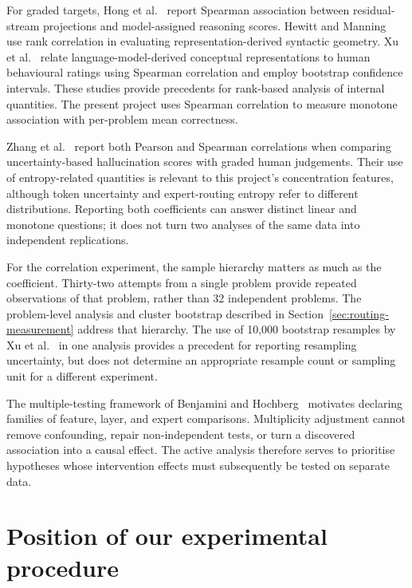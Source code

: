 \documentclass[12pt,a4paper,twoside,openright]{book}
\begin{document}
For graded targets, Hong et al.~\cite{hong2025interplay} report Spearman
association between residual-stream projections and model-assigned reasoning
scores. Hewitt and Manning~\cite{hewitt2019structural} use rank correlation in
evaluating representation-derived syntactic geometry. Xu et
al.~\cite{xu2025conceptual} relate language-model-derived conceptual
representations to human behavioural ratings using Spearman correlation and
employ bootstrap confidence intervals. These studies provide precedents for
rank-based analysis of internal quantities. The present project uses Spearman
correlation to measure monotone association with per-problem mean correctness.

Zhang et al.~\cite{zhang2023uncertainty} report both Pearson and Spearman
correlations when comparing uncertainty-based hallucination scores with
graded human judgements. Their use of entropy-related quantities is
relevant to this project's concentration features, although token uncertainty
and expert-routing entropy refer to different distributions. Reporting both
coefficients can answer distinct linear and monotone questions; it does not
turn two analyses of the same data into independent replications.

For the correlation experiment, the sample hierarchy matters as much as the
coefficient. Thirty-two attempts from a single problem provide repeated
observations of that problem, rather than 32 independent problems.
The problem-level analysis and cluster bootstrap described in
Section~\ref{sec:routing-measurement} address that hierarchy. The use of
10,000 bootstrap resamples by Xu et al.~\cite{xu2025conceptual} in one analysis
provides a precedent for reporting resampling uncertainty, but does not
determine an appropriate resample count or sampling unit for a different experiment.

The multiple-testing framework of Benjamini and Hochberg~\cite{benjamini1995fdr}
motivates declaring families of feature, layer, and expert comparisons.
Multiplicity adjustment cannot remove confounding,
repair non-independent tests, or turn a discovered association into a causal
effect. The active analysis therefore serves to prioritise hypotheses whose
intervention effects must subsequently be tested on separate data.

\section{Position of our experimental procedure}
\label{sec:project-position}
\end{document}
